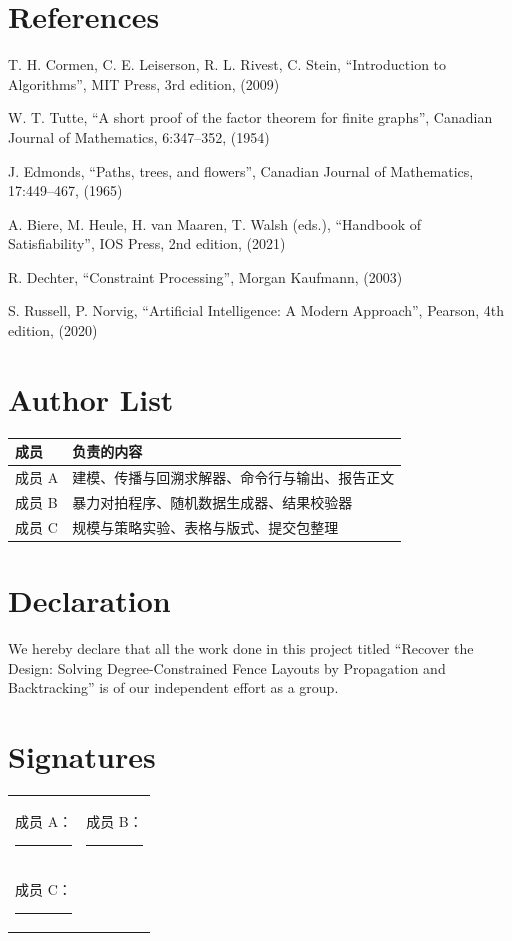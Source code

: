 \documentclass[12pt,a4paper,fontset=windows]{ctexart}
\begin{document}
\section*{References}
\small
\begin{enumerate}[label={[\arabic*]},itemsep=0pt,topsep=2pt]
  \item T. H. Cormen, C. E. Leiserson, R. L. Rivest, C. Stein, ``Introduction to Algorithms'', MIT Press, 3rd edition, (2009)
  \item W. T. Tutte, ``A short proof of the factor theorem for finite graphs'', Canadian Journal of Mathematics, 6:347--352, (1954)
  \item J. Edmonds, ``Paths, trees, and flowers'', Canadian Journal of Mathematics, 17:449--467, (1965)
  \item A. Biere, M. Heule, H. van Maaren, T. Walsh (eds.), ``Handbook of Satisfiability'', IOS Press, 2nd edition, (2021)
  \item R. Dechter, ``Constraint Processing'', Morgan Kaufmann, (2003)
  \item S. Russell, P. Norvig, ``Artificial Intelligence: A Modern Approach'', Pearson, 4th edition, (2020)
\end{enumerate}

\clearpage
\section*{Author List}

\vspace{0.2em}
\begin{center}
\begin{tabular}{ll}
\toprule
\rowcolor{gray!12}成员 & 负责的内容 \\
\midrule
成员 A & 建模、传播与回溯求解器、命令行与输出、报告正文 \\
成员 B & 暴力对拍程序、随机数据生成器、结果校验器 \\
成员 C & 规模与策略实验、表格与版式、提交包整理 \\
\bottomrule
\end{tabular}
\end{center}

\vspace{1.6em}

\section*{Declaration}

\noindent
We hereby declare that all the work done in this project titled ``Recover the Design: Solving Degree-Constrained Fence Layouts by Propagation and Backtracking'' is of our independent effort as a group.

\vspace{2.0em}
\section*{Signatures}

\vspace{1.4em}
\noindent
\begin{tabular}{@{}p{}p{}@{}}
成员 A：\rule{3.9cm}{0.4pt} & 成员 B：\rule{3.9cm}{0.4pt} \\[2.4em]
成员 C：\rule{3.9cm}{0.4pt} & \\
\end{tabular}
\end{document}

